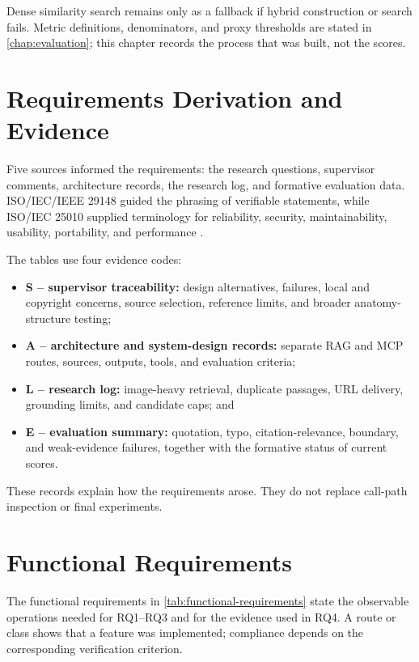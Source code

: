 Dense similarity search remains only as a fallback if hybrid construction or search fails. Metric definitions, denominators, and proxy thresholds are stated in \cref{chap:evaluation}; this chapter records the process that was built, not the scores.

\section{Requirements Derivation and Evidence}
\label{sec:requirements-derivation}

Five sources informed the requirements: the research questions, supervisor comments, architecture records, the research log, and formative evaluation data. ISO/IEC/IEEE 29148 guided the phrasing of verifiable statements, while ISO/IEC 25010 supplied terminology for reliability, security, maintainability, usability, portability, and performance \parencite{iso29148,iso25010}.

The tables use four evidence codes:

\begin{itemize}[leftmargin=*,nosep]
  \item \textbf{S -- supervisor traceability:} design alternatives, failures, local and copyright concerns, source selection, reference limits, and broader anatomy-structure testing;
  \item \textbf{A -- architecture and system-design records:} separate RAG and MCP routes, sources, outputs, tools, and evaluation criteria;
  \item \textbf{L -- research log:} image-heavy retrieval, duplicate passages, URL delivery, grounding limits, and candidate caps; and
  \item \textbf{E -- evaluation summary:} quotation, typo, citation-relevance, boundary, and weak-evidence failures, together with the formative status of current scores.
\end{itemize}

These records explain how the requirements arose. They do not replace call-path inspection or final experiments.

\section{Functional Requirements}
\label{sec:functional-requirements}

The functional requirements in \cref{tab:functional-requirements} state the observable operations needed for RQ1--RQ3 and for the evidence used in RQ4. A route or class shows that a feature was implemented; compliance depends on the corresponding verification criterion.

